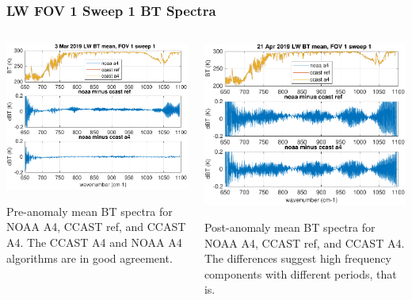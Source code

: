 \documentclass[10pt]{beamer}
\begin{document}
\begin{frame}
\frametitle{LW FOV 1 Sweep 1 BT Spectra}
\begin{columns}[t]
\begin{column}{0.5\textwidth}
  \begin{centering}
  \includegraphics[width=\textwidth]{figures/LW_pre_fail_BT_fov1_sd1.pdf}
  \end{centering}\vspace{3mm}
  Pre-anomaly mean BT spectra for NOAA A4, CCAST ref, and CCAST A4.
  The CCAST A4 and NOAA A4 algorithms are in good agreement.

\end{column}
\begin{column}{0.5\textwidth}  
  \begin{centering}
  \includegraphics[width=\textwidth]{figures/LW_post_fail_BT_fov1_sd1.pdf}
  \end{centering}\vspace{3mm}
  Post-anomaly mean BT spectra for NOAA A4, CCAST ref, and CCAST A4.
  The differences suggest high frequency components with different
  periods, that is.

\end{column}
\end{columns}
\end{frame}
\end{document}
